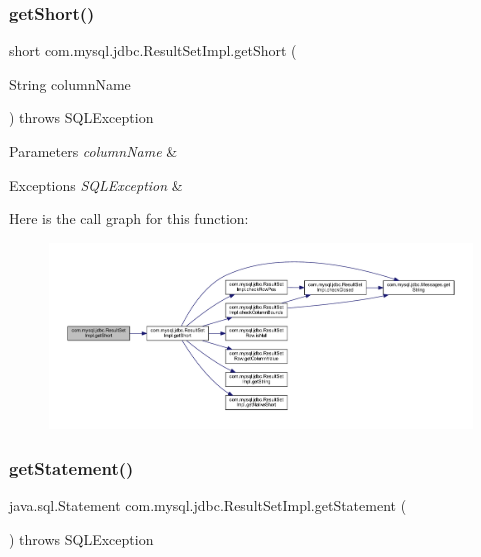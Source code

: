 \subsubsection{\texorpdfstring{get\+Short()}{getShort()}\hspace{0.1cm}{\footnotesize\ttfamily [2/2]}}
{\footnotesize\ttfamily short com.\+mysql.\+jdbc.\+Result\+Set\+Impl.\+get\+Short (\begin{DoxyParamCaption}\item[{String}]{column\+Name }\end{DoxyParamCaption}) throws S\+Q\+L\+Exception}


\begin{DoxyParams}{Parameters}
{\em column\+Name} & \\
\hline
\end{DoxyParams}

\begin{DoxyExceptions}{Exceptions}
{\em S\+Q\+L\+Exception} & \\
\hline
\end{DoxyExceptions}
Here is the call graph for this function\+:
\nopagebreak
\begin{figure}[H]
\begin{center}
\leavevmode
\includegraphics[width=350pt]{classcom_1_1mysql_1_1jdbc_1_1_result_set_impl_af2d2439bfaa7c82a682b5f532a641cc8_cgraph}
\end{center}
\end{figure}
\mbox{\label{classcom_1_1mysql_1_1jdbc_1_1_result_set_impl_aa273417ff6343608afc4e9dfd9972f8a}} 
\subsubsection{\texorpdfstring{get\+Statement()}{getStatement()}}
{\footnotesize\ttfamily java.\+sql.\+Statement com.\+mysql.\+jdbc.\+Result\+Set\+Impl.\+get\+Statement (\begin{DoxyParamCaption}{ }\end{DoxyParamCaption}) throws S\+Q\+L\+Exception}

